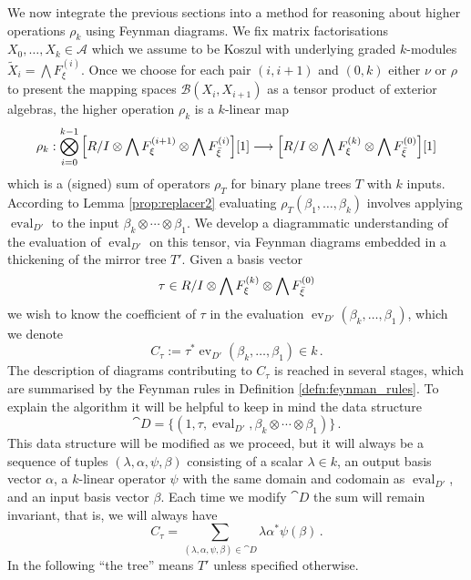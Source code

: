 \documentclass[english,letter paper,12pt,leqno]{article}
\theoremstyle{example}
\numberwithin{equation}{section}
\def\AA{\mathcal{A}}
\def\BB{\mathcal{B}}
\def\eval{\operatorname{ev}}
\def\be{\begin{equation}}
\def\ee{\end{equation}}
\begin{document}
We now integrate the previous sections into a method for reasoning about higher operations $\rho_k$ using Feynman diagrams. We fix matrix factorisations $X_0,\ldots,X_k \in \AA$ which we assume to be Koszul with underlying graded $k$-modules $\widetilde{X}_i = \bigwedge F^{(i)}_\xi$. Once we choose for each pair $(i,i+1)$ and $(0,k)$ either $\nu$ or $\rho$ to present the mapping spaces $\BB(X_i, X_{i+1})$ as a tensor product of exterior algebras, the higher operation $\rho_k$ is a $k$-linear map
\be
\rho_k: \bigotimes_{i=0}^{k-1}\Big[ R/I \otimes \bigwedge F_{\xi}^{(i+1)} \otimes \bigwedge F_{\Bar{\xi}}^{(i)} \Big][1] \lto \Big[ R/I \otimes \bigwedge F_{\xi}^{(k)} \otimes \bigwedge F_{\Bar{\xi}}^{(0)} \Big] [1]
\ee
which is a (signed) sum of operators $\rho_T$ for binary plane trees $T$ with $k$ inputs. According to Lemma \ref{prop:replacer2} evaluating $\rho_T( \beta_1, \ldots, \beta_k )$ involves applying $\operatorname{eval}_{D'}$ to the input $\beta_k \otimes \cdots \otimes \beta_1$. We develop a diagrammatic understanding of the evaluation of $\operatorname{eval}_{D'}$ on this tensor, via Feynman diagrams embedded in a thickening of the mirror tree $T'$. Given a basis vector
\[
\tau \in R/I \otimes \bigwedge F_\xi^{(k)} \otimes \bigwedge F_{\Bar{\xi}}^{(0)}
\]
we wish to know the coefficient of $\tau$ in the evaluation $\eval_{D'}( \beta_k, \ldots, \beta_1 )$, which we denote
\be\label{eq:defn_ctau}
C_\tau := \tau^* \eval_{D'}( \beta_k, \ldots, \beta_1 ) \in k\,.
\ee
The description of diagrams contributing to $C_\tau$ is reached in several stages, which are summarised by the Feynman rules in Definition \ref{defn:feynman_rules}. To explain the algorithm it will be helpful to keep in mind the data structure
\be
\cat{D} = \{ ( 1, \tau, \operatorname{eval}_{D'}, \beta_k \otimes \cdots \otimes \beta_1 ) \}\,.
\ee
This data structure will be modified as we proceed, but it will always be a sequence of tuples $(\lambda, \alpha, \psi, \beta)$ consisting of a scalar $\lambda \in k$, an output basis vector $\alpha$, a $k$-linear operator $\psi$ with the same domain and codomain as $\operatorname{eval}_{D'}$, and an input basis vector $\beta$. Each time we modify $\cat{D}$ the sum will remain invariant, that is, we will always have
\be\label{eq:ctauconstraint}
C_\tau = \sum_{(\lambda, \alpha, \psi, \beta) \in \cat{D}} \lambda \alpha^* \psi( \beta )\,.
\ee
In the following ``the tree'' means $T'$ unless specified otherwise. 
\\
\end{document}
